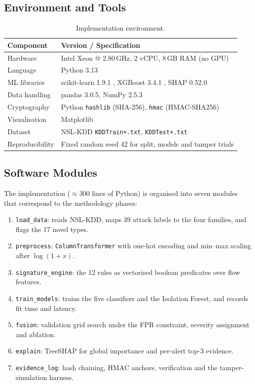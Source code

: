 \documentclass[12pt,a4paper,oneside]{article}
\begin{document}
\subsection{Environment and Tools}
\begin{table}[H]\centering\small
\caption{Implementation environment.}\label{tab:env}
\begin{tabular}{ll}
\toprule
\textcolor{rblue}{Component} & \textcolor{rblue}{Version / Specification} \\ \midrule
Hardware & Intel Xeon @ 2.80\,GHz, 2 vCPU, 8\,GB RAM (no GPU) \\
Language & Python 3.13 \\
ML libraries & scikit-learn 1.9.1 \cite{pedregosa2011scikit}, XGBoost 3.4.1 \cite{chen2016xgboost}, SHAP 0.52.0 \cite{lundberg2017unified} \\
Data handling & pandas 3.0.5, NumPy 2.5.3 \\
Cryptography & Python \texttt{hashlib} (SHA-256), \texttt{hmac} (HMAC-SHA256) \\
Visualisation & Matplotlib \\
Dataset & NSL-KDD \texttt{KDDTrain+.txt}, \texttt{KDDTest+.txt} \cite{tavallaee2009detailed} \\
Reproducibility & Fixed random seed 42 for split, models and tamper trials \\
\bottomrule
\end{tabular}
\end{table}

\subsection{Software Modules}
The implementation (\(\approx\)300 lines of Python) is organised into seven modules that correspond to the methodology phases:
\begin{enumerate}
  \item \texttt{load\_data}: reads NSL-KDD, maps 39 attack labels to the four families, and flags the 17 novel types.
  \item \texttt{preprocess}: \texttt{ColumnTransformer} with one-hot encoding and min--max scaling after $\log(1{+}x)$.
  \item \texttt{signature\_engine}: the 12 rules as vectorised boolean predicates over flow features.
  \item \texttt{train\_models}: trains the five classifiers and the Isolation Forest, and records fit time and latency.
  \item \texttt{fusion}: validation grid search under the FPR constraint, severity assignment and ablation.
  \item \texttt{explain}: TreeSHAP for global importance and per-alert top-3 evidence.
  \item \texttt{evidence\_log}: hash chaining, HMAC anchors, verification and the tamper-simulation harness.
\end{enumerate}
\end{document}
